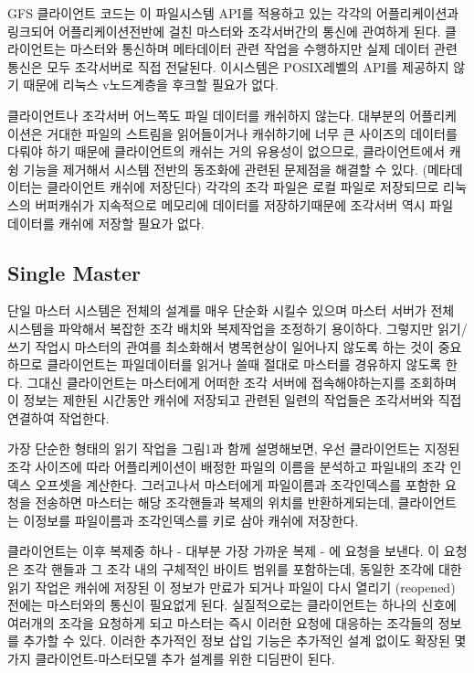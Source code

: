\documentclass[twocolumn]{article}
\begin{document}
 GFS 클라이언트 코드는 이 파일시스템 API를 적용하고 있는 각각의 어플리케이션과 링크되어 어플리케이션전반에 걸친 마스터와 조각서버간의 통신에 관여하게 된다.  클라이언트는 마스터와 통신하며 메타데이터 관련 작업을 수행하지만 실제 데이터 관련 통신은 모두 조각서버로 직접 전달된다.  이시스템은 POSIX레벨의 API를 제공하지 않기 때문에 리눅스 v노드계층을 후크할 필요가 없다.

  클라이언트나 조각서버 어느쪽도 파일 데이터를 캐쉬하지 않는다.  대부분의 어플리케이션은 거대한 파일의 스트림을 읽어들이거나 캐쉬하기에 너무 큰 사이즈의 데이터를 다뤄야 하기 때문에 클라이언트의 캐쉬는 거의 유용성이 없으므로, 클라이언트에서 캐슁 기능을 제거해서 시스템 전반의 동조화에 관련된 문제점을 해결할 수 있다. (메타데이터는 클라이언트 캐쉬에 저장딘다)  각각의 조각 파일은 로컬 파일로 저장되므로 리눅스의 버퍼캐쉬가 지속적으로 메모리에 데이터를 저장하기때문에 조각서버 역시 파일 데이터를 캐쉬에 저장할 필요가 없다.


\subsection{Single Master}

  단일 마스터 시스템은 전체의 설계를 매우 단순화 시킬수 있으며 마스터 서버가 전체 시스템을 파악해서 복잡한 조각 배치와 복제작업을 조정하기 용이하다.  그렇지만 읽기/쓰기 작업시 마스터의 관여를 최소화해서 병목현상이 일어나지 않도록 하는 것이 중요하므로 클라이언트는 파일데이터를 읽거나 쓸때 절대로 마스터를 경유하지 않도록 한다.  그대신 클라이언트는 마스터에게 어떠한 조각 서버에 접속해야하는지를 조회하며 이 정보는 제한된 시간동안 캐쉬에 저장되고 관련된 일련의 작업들은 조각서버와 직접 연결하여 작업한다.

  가장 단순한 형태의 읽기 작업을 그림1과 함께 설명해보면, 우선 클라이언트는 지정된 조각 사이즈에 따라 어플리케이션이 배정한 파일의 이름을 분석하고 파일내의 조각 인덱스 오프셋을 계산한다. 그러고나서 마스터에게 파일이름과 조각인덱스를 포함한 요청을 전송하면 마스터는 해당 조각핸들과 복제의 위치를 반환하게되는데, 클라이언트는 이정보를 파일이름과 조각인덱스를 키로 삼아 캐쉬에 저장한다.

  클라이언트는 이후 복제중 하나 - 대부분 가장 가까운 복제 - 에 요청을 보낸다.  이 요청은 조각 핸들과 그 조각 내의 구체적인 바이트 범위를 포함하는데, 동일한 조각에 대한 읽기 작업은 캐쉬에 저장된 이 정보가 만료가 되거나 파일이 다시 열리기 (reopened) 전에는 마스터와의 통신이 필요없게 된다. 실질적으로는 클라이언트는 하나의 신호에 여러개의 조각을 요청하게 되고 마스터는 즉시 이러한 요청에 대응하는 조각들의 정보를 추가할 수 있다.  이러한 추가적인 정보 삽입 기능은 추가적인 설계 없이도 확장된 몇가지 클라이언트-마스터모델 추가 설계를 위한 디딤판이 된다.
\end{document}
